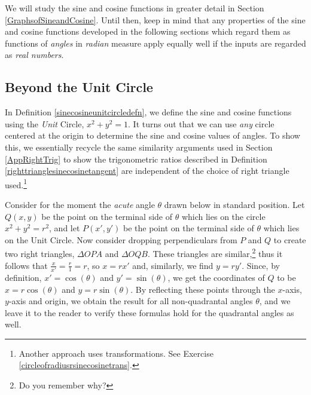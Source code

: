 \smallskip

We will study the sine and cosine functions in greater detail in Section \ref{GraphsofSineandCosine}.  Until then, keep in mind that any properties of the sine and cosine functions developed in the following sections which regard them as functions of \textit{angles} in \textit{radian} measure apply equally well if the inputs are regarded as \textit{real numbers}.


\smallskip

\subsection{Beyond the Unit Circle}
\label{cosinesinebeyond}

In Definition \ref{sinecosineunitcircledefn}, we define the sine and cosine functions using the \textit{Unit} Circle, $x^2+y^2=1$.   It turns out that we can use \textit{any} circle centered at the origin to determine the sine and cosine values of angles.  To show this,  we essentially recycle the same similarity arguments used in Section \ref{AppRightTrig} to show the trigonometric ratios described in Definition \ref{righttrianglesinecosinetangent} are independent of the choice of right triangle used.\footnote{Another approach uses transformations.  See Exercise \ref{circleofradiusrsinecosinetrans}.}

\smallskip

Consider for the moment the \textit{acute} angle $\theta$ drawn below in standard position.  Let $Q(x,y)$ be the point on the terminal side of $\theta$ which lies on the circle $x^2+y^2 = r^2$, and let $P(x',y')$ be the point on the terminal side of $\theta$ which lies on the Unit Circle.   Now consider dropping perpendiculars from $P$ and $Q$ to create two right triangles, $\Delta OPA$ and $\Delta OQB$. These triangles are similar,\footnote{Do you remember why?} thus it follows that $\frac{x}{x'} = \frac{r}{1} = r$, so $x = r x'$ and, similarly, we find $y = r y'$.  Since, by definition, $x' = \cos(\theta)$ and $y' = \sin(\theta)$,  we get the coordinates of $Q$ to be $x = r \cos(\theta)$ and $y = r \sin(\theta)$.  By reflecting these points through the $x$-axis, $y$-axis and origin, we obtain the result for all non-quadrantal angles $\theta$, and we leave it to the reader to verify these formulas hold for the quadrantal angles as well.

